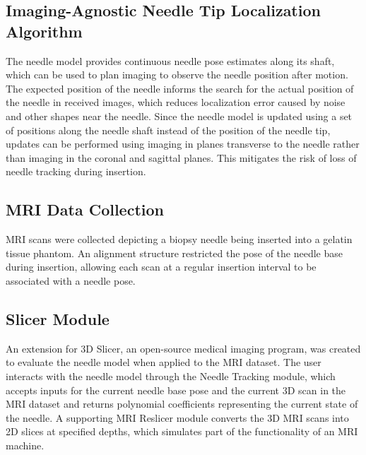 \subsection{Imaging-Agnostic Needle Tip Localization Algorithm}
The needle model provides continuous needle pose estimates along its shaft, which can be used to plan imaging to observe the needle position after motion. The expected position of the needle informs the search for the actual position of the needle in received images, which reduces localization error caused by noise and other shapes near the needle. Since the needle model is updated using a set of positions along the needle shaft instead of the position of the needle tip, updates can be performed using imaging in planes transverse to the needle rather than imaging in the coronal and sagittal planes. This mitigates the risk of loss of needle tracking during insertion.

\subsection{MRI Data Collection}
MRI scans were collected depicting a biopsy needle being inserted into a gelatin tissue phantom. An alignment structure restricted the pose of the needle base during insertion, allowing each scan at a regular insertion interval to be associated with a needle pose.

\subsection{Slicer Module}
An extension for 3D Slicer, an open-source medical imaging program\cite{_3d_, fedorov_3d_2012}, was created to evaluate the needle model when applied to the MRI dataset. The user interacts with the needle model through the Needle Tracking module, which accepts inputs for the current needle base pose and the current 3D scan in the MRI dataset and returns polynomial coefficients representing the current state of the needle. A supporting MRI Reslicer module converts the 3D MRI scans into 2D slices at specified depths, which simulates part of the functionality of an MRI machine.



